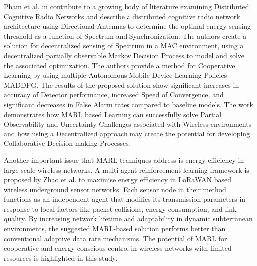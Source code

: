 \documentclass[a4paper,fleqn]{cas-dc}
\numberwithin{equation}{section}
\begin{document}
Pham et al. in \cite{pham2024multi} contribute to a growing body of literature examining Distributed Cognitive Radio Networks and describe a distributed cognitive radio network architecture using Directional Antennas to determine the optimal energy sensing threshold as a function of Spectrum and Synchronization. The authors create a solution for decentralized sensing of Spectrum in a MAC environment, using a decentralized partially observable Markov Decision Process to model and solve the associated optimization. The authors provide a method for Cooperative Learning by using multiple Autonomous Mobile Device Learning Policies MADDPG. The results of the proposed solution show significant increases in accuracy of Detector performance, increased Speed of Convergence, and significant decreases in False Alarm rates compared to baseline models. The work demonstrates how MARL based Learning can successfully solve Partial Observability and Uncertainty Challenges associated with Wireless environments and how using a Decentralized approach may create the potential for developing Collaborative Decision-making Processes.

Another important issue that MARL techniques address is energy efficiency in large scale wireless networks. A multi agent reinforcement learning framework is proposed by Zhao et al. \cite{zhao2023optimizing} to maximise energy efficiency in LoRaWAN based wireless underground sensor networks. Each sensor node in their method functions as an independent agent that modifies its transmission parameters in response to local factors like packet collisions, energy consumption, and link quality. By increasing network lifetime and adaptability in dynamic subterranean environments, the suggested MARL-based solution performs better than conventional adaptive data rate mechanisms. The potential of MARL for cooperative and energy-conscious control in wireless networks with limited resources is highlighted in this study.
\end{document}
